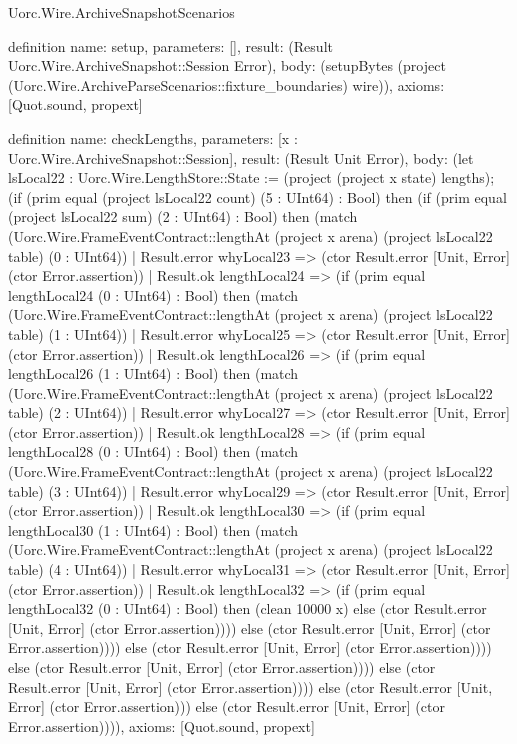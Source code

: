 \begin{lexlean}{Uorc.Wire.ArchiveSnapshotScenarios}
\begin{semanticmodule}
definition{
  name: setup,
  parameters: [],
  result: (Result Uorc.Wire.ArchiveSnapshot::Session Error),
  body: (setupBytes (project (Uorc.Wire.ArchiveParseScenarios::fixture_boundaries) wire)),
  axioms: [Quot.sound, propext]
}

definition{
  name: checkLengths,
  parameters: [x : Uorc.Wire.ArchiveSnapshot::Session],
  result: (Result Unit Error),
  body: (let lsLocal22 : Uorc.Wire.LengthStore::State := (project (project x state) lengths); (if (prim equal (project lsLocal22 count) (5 : UInt64) : Bool) then (if (prim equal (project lsLocal22 sum) (2 : UInt64) : Bool) then (match (Uorc.Wire.FrameEventContract::lengthAt (project x arena) (project lsLocal22 table) (0 : UInt64))
    | Result.error whyLocal23 => (ctor Result.error [Unit, Error] (ctor Error.assertion))
    | Result.ok lengthLocal24 => (if (prim equal lengthLocal24 (0 : UInt64) : Bool) then (match (Uorc.Wire.FrameEventContract::lengthAt (project x arena) (project lsLocal22 table) (1 : UInt64))
      | Result.error whyLocal25 => (ctor Result.error [Unit, Error] (ctor Error.assertion))
      | Result.ok lengthLocal26 => (if (prim equal lengthLocal26 (1 : UInt64) : Bool) then (match (Uorc.Wire.FrameEventContract::lengthAt (project x arena) (project lsLocal22 table) (2 : UInt64))
        | Result.error whyLocal27 => (ctor Result.error [Unit, Error] (ctor Error.assertion))
        | Result.ok lengthLocal28 => (if (prim equal lengthLocal28 (0 : UInt64) : Bool) then (match (Uorc.Wire.FrameEventContract::lengthAt (project x arena) (project lsLocal22 table) (3 : UInt64))
          | Result.error whyLocal29 => (ctor Result.error [Unit, Error] (ctor Error.assertion))
          | Result.ok lengthLocal30 => (if (prim equal lengthLocal30 (1 : UInt64) : Bool) then (match (Uorc.Wire.FrameEventContract::lengthAt (project x arena) (project lsLocal22 table) (4 : UInt64))
            | Result.error whyLocal31 => (ctor Result.error [Unit, Error] (ctor Error.assertion))
            | Result.ok lengthLocal32 => (if (prim equal lengthLocal32 (0 : UInt64) : Bool) then (clean 10000 x) else (ctor Result.error [Unit, Error] (ctor Error.assertion)))) else (ctor Result.error [Unit, Error] (ctor Error.assertion)))) else (ctor Result.error [Unit, Error] (ctor Error.assertion)))) else (ctor Result.error [Unit, Error] (ctor Error.assertion)))) else (ctor Result.error [Unit, Error] (ctor Error.assertion)))) else (ctor Result.error [Unit, Error] (ctor Error.assertion))) else (ctor Result.error [Unit, Error] (ctor Error.assertion)))),
  axioms: [Quot.sound, propext]
}


\end{semanticmodule}
\end{lexlean}

